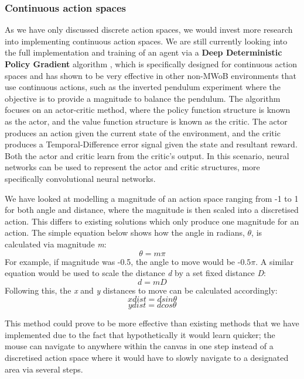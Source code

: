 \documentclass[conference]{IEEEtran}
\begin{document}
\subsubsection{Continuous action spaces}
As we have only discussed discrete action spaces, we would invest more research into implementing continuous action spaces. We are still currently looking into the full implementation and training of an agent via a \textbf{Deep Deterministic Policy Gradient} algorithm \cite{lillicrap2015continuous}, which is specifically designed for continuous action spaces and has shown to be very effective in other non-MWoB environments that use continuous actions, such as the inverted pendulum experiment \cite{pendulum} where the objective is to provide a magnitude to balance the pendulum. The algorithm focuses on an actor-critic method, where the policy function structure is known as the actor, and the value function structure is known as the critic. The actor produces an action given the current state of the environment, and the critic produces a Temporal-Difference error signal given the state and resultant reward. Both the actor and critic learn from the critic's output. In this scenario, neural networks can be used to represent the actor and critic structures, more specifically convolutional neural networks.

We have looked at modelling a magnitude of an action space ranging from -1 to 1 for both angle and distance, where the magnitude is then scaled into a discretised action. This differs to existing solutions which only produce one magnitude for an action. The simple equation below shows how the angle in radians, \( \theta \), is calculated via magnitude \textit{m}:
\[ \theta=m\pi \]
For example, if magnitude was -0.5, the angle to move would be -\( 0.5\pi \). A similar equation would be used to scale the distance \textit{d} by a set fixed distance \textit{D}:
\[ d=mD \]
 Following this, the \textit{x} and \textit{y} distances to move can be calculated accordingly:
 \[ xdist=dsin\theta \]
 \[ ydist=dcos\theta \]
 
This method could prove to be more effective than existing methods that we have implemented due to the fact that hypothetically it would learn quicker; the mouse can navigate to anywhere within the canvas in one step instead of a discretised action space where it would have to slowly navigate to a designated area via several steps.
\end{document}
